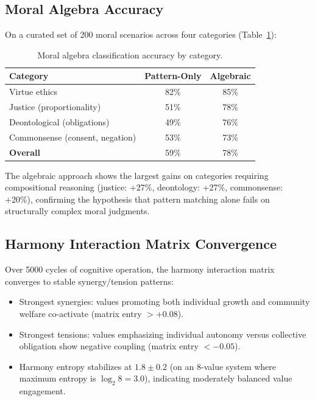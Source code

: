 \documentclass[11pt,a4paper]{article}
\begin{document}
\subsection{Moral Algebra Accuracy}

On a curated set of 200 moral scenarios across four categories (Table~\ref{tab:moral_accuracy}):

\begin{table}[h]
\centering
\caption{Moral algebra classification accuracy by category.}
\label{tab:moral_accuracy}
\begin{tabular}{lcc}
\toprule
\textbf{Category} & \textbf{Pattern-Only} & \textbf{Algebraic} \\
\midrule
Virtue ethics & 82\% & 85\% \\
Justice (proportionality) & 51\% & 78\% \\
Deontological (obligations) & 49\% & 76\% \\
Commonsense (consent, negation) & 53\% & 73\% \\
\midrule
\textbf{Overall} & 59\% & 78\% \\
\bottomrule
\end{tabular}
\end{table}

The algebraic approach shows the largest gains on categories requiring compositional reasoning (justice: +27\%, deontology: +27\%, commonsense: +20\%), confirming the hypothesis that pattern matching alone fails on structurally complex moral judgments.

\subsection{Harmony Interaction Matrix Convergence}

Over 5000 cycles of cognitive operation, the harmony interaction matrix converges to stable synergy/tension patterns:

\begin{itemize}
  \item Strongest synergies: values promoting both individual growth and community welfare co-activate (matrix entry $> +0.08$).
  \item Strongest tensions: values emphasizing individual autonomy versus collective obligation show negative coupling (matrix entry $< -0.05$).
  \item Harmony entropy stabilizes at $1.8 \pm 0.2$ (on an 8-value system where maximum entropy is $\log_2 8 = 3.0$), indicating moderately balanced value engagement.
\end{itemize}
\end{document}
